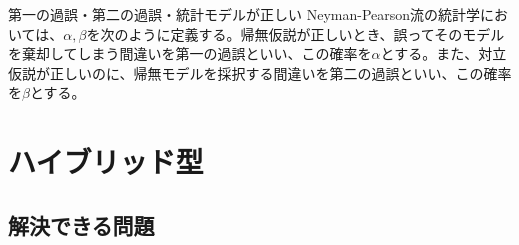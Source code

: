 \begin{SMbox}{第一の過誤・第二の過誤・統計モデルが正しい}
    Neyman-Pearson流の統計学においては、$\alpha,\beta$を次のように定義する。帰無仮説が正しいとき、誤ってそのモデルを棄却してしまう間違いを第一の過誤といい、この確率を$\alpha$とする。また、対立仮説が正しいのに、帰無モデルを採択する間違いを第二の過誤といい、この確率を$\beta$とする。

    

\end{SMbox}


\section{ハイブリッド型}
\subsection{解決できる問題}


